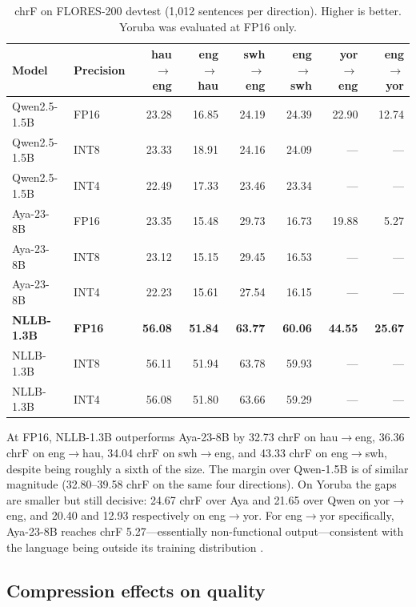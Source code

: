 \documentclass[11pt,a4paper]{article}
\begin{document}
\begin{table}[h]
\centering
\small
\begin{tabular}{llrrrrrr}
\toprule
Model & Precision & hau$\rightarrow$eng & eng$\rightarrow$hau &
swh$\rightarrow$eng & eng$\rightarrow$swh & yor$\rightarrow$eng &
eng$\rightarrow$yor \\
\midrule
Qwen2.5-1.5B & FP16 & 23.28 & 16.85 & 24.19 & 24.39 & 22.90 & 12.74 \\
Qwen2.5-1.5B & INT8 & 23.33 & 18.91 & 24.16 & 24.09 & --- & --- \\
Qwen2.5-1.5B & INT4 & 22.49 & 17.33 & 23.46 & 23.34 & --- & --- \\
\addlinespace
Aya-23-8B & FP16 & 23.35 & 15.48 & 29.73 & 16.73 & 19.88 & 5.27 \\
Aya-23-8B & INT8 & 23.12 & 15.15 & 29.45 & 16.53 & --- & --- \\
Aya-23-8B & INT4 & 22.23 & 15.61 & 27.54 & 16.15 & --- & --- \\
\addlinespace
\textbf{NLLB-1.3B} & \textbf{FP16} & \textbf{56.08} & \textbf{51.84} &
\textbf{63.77} & \textbf{60.06} & \textbf{44.55} & \textbf{25.67} \\
NLLB-1.3B & INT8 & 56.11 & 51.94 & 63.78 & 59.93 & --- & --- \\
NLLB-1.3B & INT4 & 56.08 & 51.80 & 63.66 & 59.29 & --- & --- \\
\bottomrule
\end{tabular}
\caption{chrF on FLORES-200 devtest (1{,}012 sentences per direction).
Higher is better. Yoruba was evaluated at FP16 only.}
\label{tab:main}
\end{table}

At FP16, NLLB-1.3B outperforms Aya-23-8B by 32.73 chrF on
hau$\rightarrow$eng, 36.36 chrF on eng$\rightarrow$hau, 34.04 chrF on
swh$\rightarrow$eng, and 43.33 chrF on eng$\rightarrow$swh, despite
being roughly a sixth of the size. The margin over Qwen-1.5B is of
similar magnitude (32.80--39.58 chrF on the same four directions). On
Yoruba the gaps are smaller but still decisive: 24.67 chrF over Aya and
21.65 over Qwen on yor$\rightarrow$eng, and 20.40 and 12.93
respectively on eng$\rightarrow$yor. For eng$\rightarrow$yor
specifically, Aya-23-8B reaches chrF 5.27---essentially non-functional
output---consistent with the language being outside its training
distribution \cite{aryabumi2024aya23}.

\subsection{Compression effects on quality}
\end{document}

